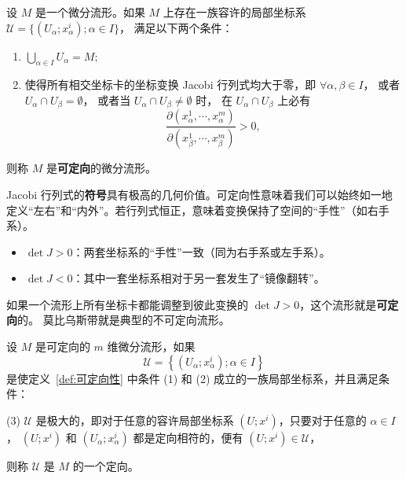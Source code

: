 \begin{definition}[可定向性]\label{def:可定向性}
  设  $M$  是一个微分流形。如果 $M$ 上存在一族容许的局部坐标系  $\mathcal{U} = \{(U_{\alpha}; x_{\alpha}^{i}); \alpha \in I\}$， 满足以下两个条件：
\begin{enumerate}
\item [(1)]   $\bigcup_{\alpha \in I} U_{\alpha} = M;$
\item [(2)]  使得所有相交坐标卡的坐标变换 Jacobi 行列式均大于零，即 $\forall \alpha, \beta \in I$， 或者  $U_{\alpha} \cap U_{\beta} = \emptyset$， 或者当  $U_{\alpha} \cap U_{\beta} \neq \emptyset$  时， 在  $U_{\alpha} \cap U_{\beta}$  上必有
\begin{equation*}
\frac {\partial \left(x _ {\alpha} ^ {1} , \cdots , x _ {\alpha} ^ {m}\right)}{\partial \left(x _ {\beta} ^ {1} , \cdots , x _ {\beta} ^ {m}\right)} > 0, \tag {1.1}
\end{equation*}
\end{enumerate}
则称  $M$  是\textbf{可定向}的微分流形。
\end{definition}

\begin{myremark}

Jacobi 行列式的\textbf{符号}具有极高的几何价值。可定向性意味着我们可以始终如一地定义“左右”和“内外”。若行列式恒正，意味着变换保持了空间的“手性”（如右手系）。
\begin{itemize}
    \item $\det J > 0$：两套坐标系的“手性”一致（同为右手系或左手系）。
    \item $\det J < 0$：其中一套坐标系相对于另一套发生了“镜像翻转”。
\end{itemize}
如果一个流形上所有坐标卡都能调整到彼此变换的 $\det J > 0$，这个流形就是\textbf{可定向}的。
莫比乌斯带就是典型的不可定向流形。

\end{myremark}

\begin{definition}[定向]
设  $M$  是可定向的  $m$  维微分流形，如果
$$
\mathscr {U} = \left\{\left(U _ {\alpha}; x _ {\alpha} ^ {i}\right); \alpha \in I \right\}
$$
是使定义~\ref{def:可定向性} 中条件 (1) 和 (2) 成立的一族局部坐标系，并且满足条件：

(3)  $\mathcal{U}$  是极大的，即对于任意的容许局部坐标系  $(U; x^i)$，只要对于任意的  $\alpha \in I$， $(U; x^i)$  和  $(U_\alpha; x_\alpha^i)$  都是定向相符的，便有  $(U; x^i) \in \mathcal{U}$，

则称  $\mathcal{U}$  是  $M$  的一个定向。
\end{definition}

